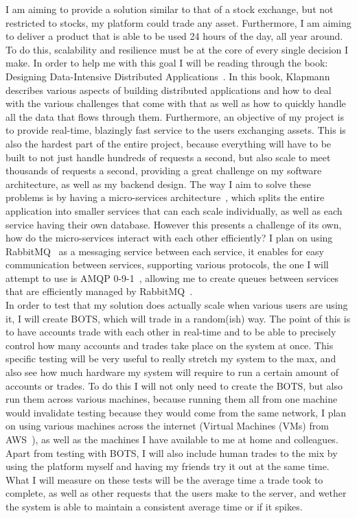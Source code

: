 \documentclass[titlepage]{article}
\begin{document}
\noindent
I am aiming to provide a solution similar to that of a stock exchange, but not restricted to stocks, my platform could trade any asset. Furthermore, I am aiming to deliver a product that is able to be used 24 hours of the day, all year around. To do this, scalability and resilience must be at the core of every single decision I make. In order to help me with this goal I will be reading through the book: Designing Data-Intensive Distributed Applications~\cite{kleppmann_2021}. In this book, Klapmann describes various aspects of building distributed applications and how to deal with the various challenges that come with that as well as how to quickly handle all the data that flows through them. Furthermore, an objective of my project is to provide real-time, blazingly fast service to the users exchanging assets. This is also the hardest part of the entire project, because everything will have to be built to not just handle hundreds of requests a second, but also scale to meet thousands of requests a second, providing a great challenge on my software architecture, as well as my backend design. The way I aim to solve these problems is by having a micro-services architecture~\cite{microservices}, which splits the entire application into smaller services that can each scale individually, as well as each service having their own database. However this presents a challenge of its own, how do the micro-services interact with each other efficiently? I plan on using RabbitMQ~\cite{rabbitmq} as a messaging service between each service, it enables for easy communication between services, supporting various protocols, the one I will attempt to use is AMQP 0-9-1~\cite{amqp}, allowing me to create queues between services that are efficiently managed by RabbitMQ~\cite{rabbitmq}. \\

\noindent
In order to test that my solution does actually scale when various users are using it, I will create BOTS, which will trade in a random(ish) way. The point of this is to have accounts trade with each other in real-time and to be able to precisely control how many accounts and trades take place on the system at once. This specific testing will be very useful to really stretch my system to the max, and also see how much hardware my system will require to run a certain amount of accounts or trades. To do this I will not only need to create the BOTS, but also run them across various machines, because running them all from one machine would invalidate testing because they would come from the same network, I plan on using various machines across the internet (Virtual Machines (VMs) from AWS~\cite{aws}), as well as the machines I have available to me at home and colleagues. Apart from testing with BOTS, I will also include human trades to the mix by using the platform myself and having my friends try it out at the same time. What I will measure on these tests will be the average time a trade took to complete, as well as other requests that the users make to the server, and wether the system is able to maintain a consistent average time or if it spikes. \\
\end{document}
